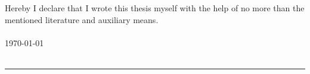 Hereby I declare that I wrote this thesis myself with the help of no more than the mentioned literature and auxiliary means.
\\\\
\today
\\\\
\begin{flushright}
\rule{5cm}{0.15mm}
\end{flushright}